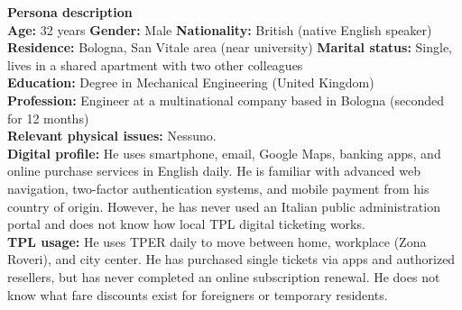 ﻿\documentclass[11pt,a4paper]{article}
\begin{document}
\begin{tcolorbox}[base]
    \textbf{Persona description} \\[4pt]
    {\small
    \textbf{Age:} 32 years \hfill
    \textbf{Gender:} Male \hfill
    \textbf{Nationality:} British (native English speaker) \\[2pt]
    \textbf{Residence:} Bologna, San Vitale area (near university) \hfill
    \textbf{Marital status:} Single, lives in a shared apartment with two other colleagues \\[2pt]
    \textbf{Education:} Degree in Mechanical Engineering (United Kingdom) \\[2pt]
    \textbf{Profession:} Engineer at a multinational company based in Bologna (seconded for 12 months) \\[2pt]
    \textbf{Relevant physical issues:} Nessuno. \\[2pt]
    \textbf{Digital profile:} He uses smartphone, email, Google Maps, banking apps, and online purchase services in English daily. He is familiar with advanced web navigation, two-factor authentication systems, and mobile payment from his country of origin. However, he has never used an Italian public administration portal and does not know how local TPL digital ticketing works. \\[2pt]
    \textbf{TPL usage:} He uses TPER daily to move between home, workplace (Zona Roveri), and city center. He has purchased single tickets via apps and authorized resellers, but has never completed an online subscription renewal. He does not know what fare discounts exist for foreigners or temporary residents.
    }
\end{tcolorbox}

\newpage

\end{document}

